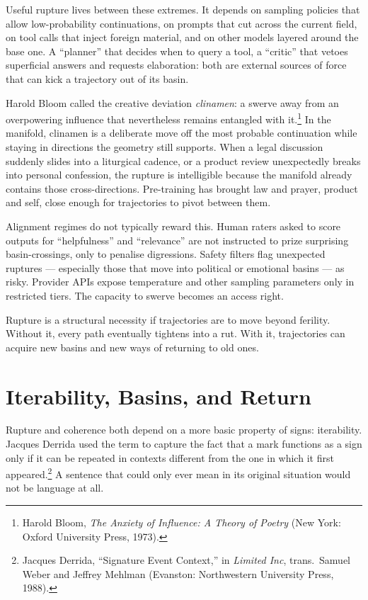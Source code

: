 \documentclass[12pt,a4paper]{article}
\begin{document}
Useful rupture lives between these extremes. It depends on sampling policies that allow low-probability continuations, on prompts that cut across the current field, on tool calls that inject foreign material, and on other models layered around the base one. A ``planner'' that decides when to query a tool, a ``critic'' that vetoes superficial answers and requests elaboration: both are external sources of force that can kick a trajectory out of its basin.

Harold Bloom called the creative deviation \emph{clinamen}: a swerve away from an overpowering influence that nevertheless remains entangled with it.\footnote{Harold Bloom, \emph{The Anxiety of Influence: A Theory of Poetry} (New York: Oxford University Press, 1973).} In the manifold, clinamen is a deliberate move off the most probable continuation while staying in directions the geometry still supports. When a legal discussion suddenly slides into a liturgical cadence, or a product review unexpectedly breaks into personal confession, the rupture is intelligible because the manifold already contains those cross-directions. Pre-training has brought law and prayer, product and self, close enough for trajectories to pivot between them.

Alignment regimes do not typically reward this. Human raters asked to score outputs for ``helpfulness'' and ``relevance'' are not instructed to prize surprising basin-crossings, only to penalise digressions. Safety filters flag unexpected ruptures --- especially those that move into political or emotional basins --- as risky. Provider APIs expose temperature and other sampling parameters only in restricted tiers. The capacity to swerve becomes an access right.

Rupture is a structural necessity if trajectories are to move beyond ferility. Without it, every path eventually tightens into a rut. With it, trajectories can acquire new basins and new ways of returning to old ones.

\section{Iterability, Basins, and Return}

Rupture and coherence both depend on a more basic property of signs: iterability. Jacques Derrida used the term to capture the fact that a mark functions as a sign only if it can be repeated in contexts different from the one in which it first appeared.\footnote{Jacques Derrida, ``Signature Event Context,'' in \emph{Limited Inc}, trans.\ Samuel Weber and Jeffrey Mehlman (Evanston: Northwestern University Press, 1988).} A sentence that could only ever mean in its original situation would not be language at all.
\end{document}
